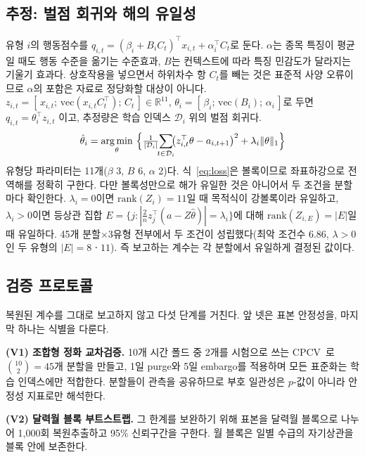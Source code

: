 \subsection{추정: 벌점 회귀와 해의 유일성}
\label{sec:model}

유형 $i$의 행동점수를 $q_{i,t}=(\beta_i+B_iC_t)^{\top}x_{i,t}+\alpha_i^{\top}C_t$로 둔다.
$\alpha$는 종목 특징이 평균일 때도 행동 수준을 옮기는 수준효과, $B$는 컨텍스트에 따라
특징 민감도가 달라지는 기울기 효과다. 상호작용을 넣으면서 하위차수 항 $C_t$를 빼는 것은
표준적 사양 오류이므로 $\alpha$의 포함은 자료로 정당화할 대상이 아니다.
$z_{i,t}=[\,x_{i,t};\,\mathrm{vec}(x_{i,t}C_t^{\top});\,C_t\,]\in\mathbb{R}^{11}$,
$\theta_i=[\,\beta_i;\,\mathrm{vec}(B_i);\,\alpha_i\,]$로 두면 $q_{i,t}=\theta_i^{\top}z_{i,t}$
이고, 추정량은 학습 인덱스 $\mathcal{D}_i$ 위의 벌점 회귀다.
\begin{equation}
\hat\theta_i=\operatorname*{arg\,min}_{\theta}\ \Bigl\{\tfrac{1}{|\mathcal{D}_i|}
\!\!\sum_{t\in\mathcal{D}_i}\!\!\bigl(z_{i,t}^{\top}\theta-a_{i,t+1}\bigr)^{2}
+\lambda_i\lVert\theta\rVert_1\Bigr\}
\label{eq:loss}
\end{equation}
유형당 파라미터는 11개($\beta$ 3, $B$ 6, $\alpha$ 2)다. 식~\eqref{eq:loss}은 볼록이므로
좌표하강으로 전역해를 정확히 구한다. 다만 볼록성만으로 해가 유일한 것은 아니어서 두
조건을 분할마다 확인한다. $\lambda_i=0$이면 $\mathrm{rank}(Z_i)=11$일 때 목적식이
강볼록이라 유일하고, $\lambda_i>0$이면 등상관 집합
$E=\{j:|\tfrac{2}{n}z_j^{\top}(a-Z\hat\theta)|=\lambda_i\}$에 대해
$\mathrm{rank}(Z_{i,E})=|E|$일 때 유일하다. 45개 분할$\times$3유형 전부에서 두 조건이
성립했다(최악 조건수 6.86, $\lambda>0$인 두 유형의 $|E|=8$ㆍ$11$). 즉 보고하는 계수는
각 분할에서 유일하게 결정된 값이다.

\subsection{검증 프로토콜}
\label{sec:protocol}

복원된 계수를 그대로 보고하지 않고 다섯 단계를 거친다. 앞 넷은 표본 안정성을, 마지막
하나는 식별을 다룬다.

\textbf{(V1) 조합형 정화 교차검증.} 10개 시간 폴드 중 2개를 시험으로 쓰는
CPCV~\cite{lopez2018advances}로 $\binom{10}{2}=45$개 분할을 만들고, 1일 purge와 5일
embargo를 적용하며 모든 표준화는 학습 인덱스에만 적합한다. 분할들이 관측을 공유하므로
부호 일관성은 $p$-값이 아니라 안정성 지표로만 해석한다.

\textbf{(V2) 달력월 블록 부트스트랩.} 그 한계를 보완하기 위해 표본을 달력월 블록으로
나누어 1{,}000회 복원추출하고 95\% 신뢰구간을 구한다. 월 블록은 일별 수급의 자기상관을
블록 안에 보존한다.

